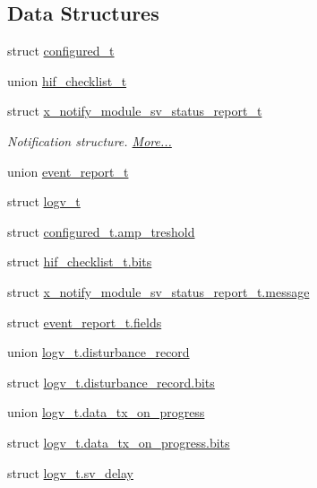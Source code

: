 \subsection*{Data Structures}
\begin{DoxyCompactItemize}
\item 
struct \hyperlink{a00021_d6/d9c/a00352}{configured\+\_\+t}
\item 
union \hyperlink{a00021_d7/d9f/a00454}{hif\+\_\+checklist\+\_\+t}
\item 
struct \hyperlink{a00021_d7/d1b/a00864}{x\+\_\+notify\+\_\+module\+\_\+sv\+\_\+status\+\_\+report\+\_\+t}
\begin{DoxyCompactList}\small\item\em Notification structure.  \hyperlink{a00021_d7/d1b/a00864}{More...}\end{DoxyCompactList}\item 
union \hyperlink{a00021_d6/d66/a00441}{event\+\_\+report\+\_\+t}
\item 
struct \hyperlink{a00021_d6/da3/a00589}{logv\+\_\+t}
\item 
struct \hyperlink{a00021_db/ddc/a00353}{configured\+\_\+t.\+amp\+\_\+treshold}
\item 
struct \hyperlink{a00021_dd/d63/a00455}{hif\+\_\+checklist\+\_\+t.\+bits}
\item 
struct \hyperlink{a00021_dd/d7b/a00865}{x\+\_\+notify\+\_\+module\+\_\+sv\+\_\+status\+\_\+report\+\_\+t.\+message}
\item 
struct \hyperlink{a00021_db/d34/a00442}{event\+\_\+report\+\_\+t.\+fields}
\item 
union \hyperlink{a00021_d0/dec/a00592}{logv\+\_\+t.\+disturbance\+\_\+record}
\item 
struct \hyperlink{a00021_d2/da3/a00593}{logv\+\_\+t.\+disturbance\+\_\+record.\+bits}
\item 
union \hyperlink{a00021_d7/db1/a00590}{logv\+\_\+t.\+data\+\_\+tx\+\_\+on\+\_\+progress}
\item 
struct \hyperlink{a00021_d9/dad/a00591}{logv\+\_\+t.\+data\+\_\+tx\+\_\+on\+\_\+progress.\+bits}
\item 
struct \hyperlink{a00021_da/de4/a00594}{logv\+\_\+t.\+sv\+\_\+delay}
\end{DoxyCompactItemize}
